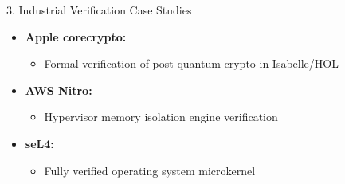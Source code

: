 \documentclass[compress,10pt,xcolor=dvipsnames]{beamer}
\begin{document}
\begin{frame}{3. Industrial Verification Case Studies}

\begin{itemize}
  \item \textbf{\textbf{Apple corecrypto}:}
    \begin{itemize}
      \item Formal verification of post-quantum crypto in Isabelle/HOL
    \end{itemize}
  \item \textbf{\textbf{AWS Nitro}:}
    \begin{itemize}
      \item Hypervisor memory isolation engine verification
    \end{itemize}
  \item \textbf{\textbf{seL4}:}
    \begin{itemize}
      \item Fully verified operating system microkernel
    \end{itemize}
\end{itemize}
\end{frame}
\end{document}
